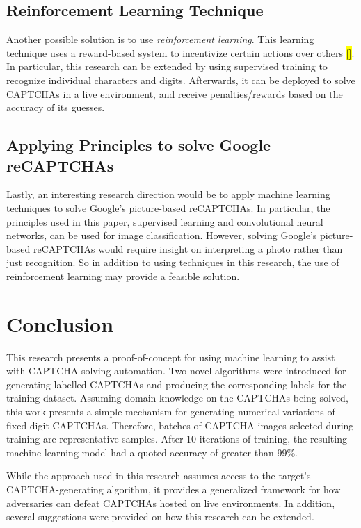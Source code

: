 \documentclass[11pt,conference]{IEEEtran}
\begin{document}
\subsection{Reinforcement Learning Technique}
Another possible solution is to use \emph{reinforcement learning}. This learning technique uses a reward-based
system to incentivize certain actions over others \hl{[]}. In particular, this research
can be extended by using supervised training to recognize individual
characters and digits. Afterwards, it can be deployed to solve CAPTCHAs in a
live environment, and receive penalties/rewards based on the accuracy of its
guesses.

\subsection{Applying Principles to solve Google reCAPTCHAs}
Lastly, an interesting research direction would be to apply machine learning
techniques to solve Google's picture-based reCAPTCHAs. In particular, the
principles used in this paper, supervised learning and convolutional neural
networks, can be used for image classification. However, solving Google's picture-based
reCAPTCHAs would require insight on interpreting a photo
rather than just recognition. So in addition to using techniques in this
research, the use of reinforcement learning may provide a feasible solution.


\section{Conclusion}
This research presents a proof-of-concept for using machine learning to assist
with CAPTCHA-solving automation. Two novel algorithms were
introduced for generating labelled CAPTCHAs and producing the corresponding
labels for the training dataset. Assuming domain knowledge on the CAPTCHAs
being solved, this work presents a simple mechanism for generating numerical variations of fixed-digit CAPTCHAs. Therefore, batches of
CAPTCHA images selected during training are representative samples. After 10
iterations of training, the resulting machine learning model had a quoted
accuracy of greater than 99\%. 

While the approach used in this research assumes access to the target's
CAPTCHA-generating algorithm, it provides a generalized framework for how
adversaries can defeat CAPTCHAs hosted on live environments. In addition,
several suggestions were provided on how this research
can be extended.
\end{document}
